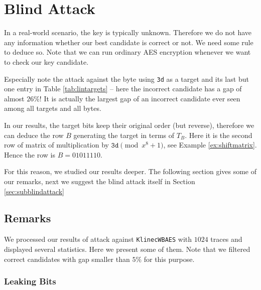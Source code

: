 \section{Blind Attack}
\label{sec:blindattack}

In a real-world scenario, the key is typically unknown. Therefore we do not have any information whether our best candidate is correct or not. We need some rule to deduce so. Note that we can run ordinary AES encryption whenever we want to check our key candidate.

\begin{remark}
\label{rem:false}
	Especially note the attack against the  byte using {\tt 3d} as a target and its last but one entry in Table \ref{tab:lintargets} -- here the incorrect candidate has a gap of almost $26\%$! It is actually the largest gap of an incorrect candidate ever seen among all targets and all bytes.
	
	In our results, the target bits keep their original order (but reverse), therefore we can deduce the row $B$ generating the target in terms of $T_B$. Here it is the second row of matrix of multiplication by $\texttt{3d}\pmod{x^8+1}$, see Example \ref{ex:shiftmatrix}. Hence the row is $B = 01011110$.
\end{remark}

For this reason, we studied our results deeper. The following section gives some of our remarks, next we suggest the blind attack itself in Section \ref{sec:subblindattack}



\subsection{Remarks}
\label{sec:remarks}

We processed our results of attack against {\tt KlinecWBAES} with $1024$ traces and displayed several statistics. Here we present some of them. Note that we filtered correct candidates with gap smaller than $5\%$ for this purpose.

\subsubsection{Leaking Bits}
	
